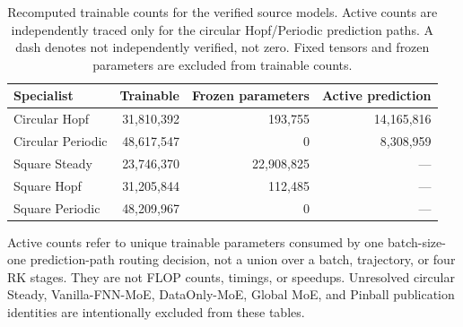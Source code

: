 \begin{table}[htbp]
\centering\small
\setlength{\tabcolsep}{5pt}
\caption{Recomputed trainable counts for the verified source models. Active
counts are independently traced only for the circular Hopf/Periodic
prediction paths. A dash denotes not independently verified, not zero.
Fixed tensors and frozen parameters are excluded from trainable counts.}
\label{tab:audit_parameter_recheck}
\begin{tabular}{@{}lrrr@{}}
\toprule
Specialist & Trainable & Frozen parameters & Active prediction \\
\midrule
Circular Hopf & 31,810,392 & 193,755 & 14,165,816 \\
Circular Periodic & 48,617,547 & 0 & 8,308,959 \\
Square Steady & 23,746,370 & 22,908,825 & --- \\
Square Hopf & 31,205,844 & 112,485 & --- \\
Square Periodic & 48,209,967 & 0 & --- \\
\bottomrule
\end{tabular}
\end{table}

Active counts refer to unique trainable parameters consumed by one
batch-size-one prediction-path routing decision, not a union over a batch,
trajectory, or four RK stages. They are not FLOP counts, timings, or speedups.
Unresolved circular Steady, Vanilla-FNN-MoE, DataOnly-MoE, Global MoE, and
Pinball publication identities are intentionally excluded from these tables.
